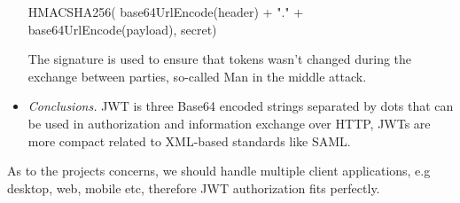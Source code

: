 \begin{itemize}
    \begin{spverbatim}
        HMACSHA256(
        base64UrlEncode(header) + "." +
        base64UrlEncode(payload),
        secret)
    \end{spverbatim}

    The signature is used to ensure that tokens wasn't changed during the exchange between parties,
    so-called Man in the middle attack.
    \item \textit{Conclusions.} JWT is three Base64 encoded strings separated by dots that can be
    used in authorization and information exchange over HTTP,
    JWTs are more compact related to XML-based standards like SAML\@.
\end{itemize}

As to the projects concerns, we should handle multiple client applications, e.g desktop,
web, mobile etc, therefore JWT authorization fits perfectly.

